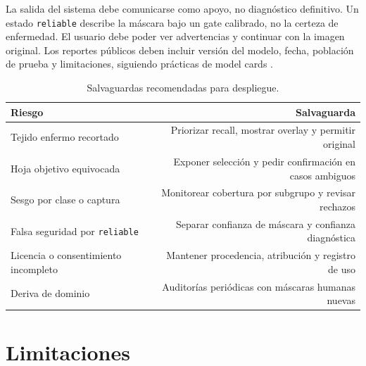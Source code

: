 \documentclass[11pt,a4paper]{article}
\begin{document}
La salida del sistema debe comunicarse como apoyo, no diagnóstico definitivo. Un estado \texttt{reliable} describe la máscara bajo un gate calibrado, no la certeza de enfermedad. El usuario debe poder ver advertencias y continuar con la imagen original. Los reportes públicos deben incluir versión del modelo, fecha, población de prueba y limitaciones, siguiendo prácticas de model cards \citep{mitchell2019modelcards}.


\begin{table}[H]
\centering
\caption{Salvaguardas recomendadas para despliegue.}
\small
\begin{tabular}{lr}
\toprule
Riesgo & Salvaguarda \\
\midrule
Tejido enfermo recortado & Priorizar recall, mostrar overlay y permitir original \\
Hoja objetivo equivocada & Exponer selección y pedir confirmación en casos ambiguos \\
Sesgo por clase o captura & Monitorear cobertura por subgrupo y revisar rechazos \\
Falsa seguridad por \texttt{reliable} & Separar confianza de máscara y confianza diagnóstica \\
Licencia o consentimiento incompleto & Mantener procedencia, atribución y registro de uso \\
Deriva de dominio & Auditorías periódicas con máscaras humanas nuevas \\
\bottomrule
\end{tabular}
\end{table}

\section{Limitaciones}
\end{document}
